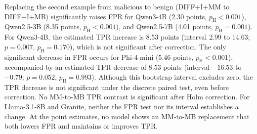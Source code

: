 \documentclass[a4paper,fleqn]{cas-dc}
\begin{document}
Replacing the second example from malicious to benign (DIFF+I+MM to DIFF+I+MB)
significantly raises FPR for Qwen3-4B (2.30 points, $p_{\mathrm{H}} < 0.001$),
Qwen2.5-3B (8.35 points, $p_{\mathrm{H}} < 0.001$), and Qwen2.5-7B (4.01
points, $p_{\mathrm{H}} = 0.001$). For Qwen3-4B, the estimated TPR increase
is 8.53 points (interval 2.99 to 14.63; $p = 0.007$, $p_{\mathrm{H}} = 0.170$),
which is not significant after correction. The only significant decrease in
FPR occurs for Phi-4-mini (5.46 points, $p_{\mathrm{H}} < 0.001$), accompanied
by an estimated TPR decrease of 8.53 points (interval $-16.53$ to $-0.79$;
$p = 0.052$, $p_{\mathrm{H}} = 0.993$). Although this bootstrap interval
excludes zero, the TPR decrease is not significant under the discrete paired
test, even before correction. No MM-to-MB TPR contrast is significant after
Holm correction. For Llama-3.1-8B and Granite, neither the FPR test nor its
interval establishes a change. At the point estimates, no model shows an
MM-to-MB replacement that both lowers FPR and maintains or improves TPR.
\end{document}
